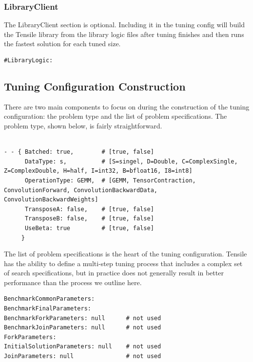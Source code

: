 \documentclass[]{article}
\begin{document}
\subsubsection{LibraryClient}
\label{sec:LibClient}

\noindent
The LibraryClient section is optional. Including it in the tuning config will build the Tensile library from the library logic files after tuning finishes and then runs the fastest solution for each tuned size.

\begin{verbatim}
#LibraryLogic:
\end{verbatim}


\subsection{Tuning Configuration Construction}

There are two main components to focus on during the construction of the tuning configuration: the problem type and the list of problem specifications. The problem type, shown below, is fairly straightforward.

\begin{verbatim}

- - { Batched: true,        # [true, false]
      DataType: s,          # [S=singel, D=Double, C=ComplexSingle, Z=ComplexDouble, H=half, I=int32, B=bfloat16, I8=int8]
      OperationType: GEMM,  # [GEMM, TensorContraction, ConvolutionForward, ConvolutionBackwardData, ConvolutionBackwardWeights]
      TransposeA: false,    # [true, false]
      TransposeB: false,    # [true, false]
      UseBeta: true         # [true, false]
     }

\end{verbatim}

The list of problem specifications is the heart of the tuning configuration. Tensile has the ability to define a multi-step tuning process that includes a complex set of search specifications, but in practice does not generally result in better performance than the process we outline here.
\begin{verbatim}
BenchmarkCommonParameters:
BenchmarkFinalParameters:
BenchmarkForkParameters: null      # not used
BenchmarkJoinParameters: null      # not used
ForkParameters:
InitialSolutionParameters: null    # not used
JoinParameters: null               # not used
\end{verbatim}
\end{document}
